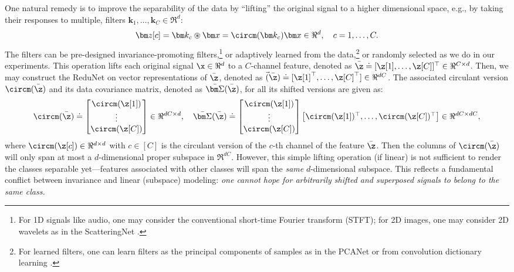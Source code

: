 \documentclass[../../book-main.tex]{subfiles}
\begin{document}
One natural remedy is to improve the separability of the data by ``lifting'' the original signal to a higher dimensional space, e.g., by taking their responses to multiple, filters $\bm k_1, \ldots, \bm k_C \in \Re^d$: 
\begin{equation}
\bm z[c] = \bm k_c \circledast \bm x  =  \circm(\bm k_c) \bm x \in \Re^d, \quad c = 1, \ldots, C.
\label{eqn:lift-1d}
\end{equation} 
The filters can be pre-designed invariance-promoting filters,\footnote{For 1D signals like audio, one may consider the conventional short-time Fourier transform (STFT); for 2D images, one may consider 2D wavelets as in the ScatteringNet \cite{scattering-net}.} or adaptively learned from the data,\footnote{For learned filters, one can learn filters as the principal components of samples as in the PCANet \cite{chan2015pcanet} or from convolution dictionary learning \cite{li2019multichannel,qu2019nonconvex}.} or randomly selected as we do in our experiments. This operation lifts each original signal $\x \in \Re^d$ to a $C$-channel feature, denoted as $\bar{\z}  \doteq [\z[1], \ldots, \z[C]]^\top \in \Re^{C\times d}$. 
Then, we may construct the ReduNet on vector representations of $\bar{\z}$, denoted as
$\vec(\bar\z) \doteq [\z[1]^\top, \ldots, \z[C]^\top] \in \Re^{dC}$. 
The associated circulant version $ \circm(\bar{\z})$ and its data covariance matrix, denoted as $\bar{\bm \Sigma}(\bar\z)$, for all its shifted versions are given as:
\begin{equation}
\begin{aligned}
 \circm(\bar{\z}) \doteq \left[\begin{matrix}
    \circm(\z[1])  \\ \vdots \\ \circm(\z[C]) \end{matrix} \right] \in \Re^{dC\times d}, 
    \quad  \bar{\bm \Sigma}(\bar\z) \doteq 
    \left[\begin{matrix}
    \circm(\z[1]) \\ \vdots \\ \circm(\z[C]) \end{matrix} \right]
    \left[\begin{matrix}\circm(\z[1])^\top,\ldots, \circm(\z[C])^\top\end{matrix} \right] \in \Re^{dC\times dC},
    \label{eqn:W-multichannel}
\end{aligned}
\end{equation}
where $\circm(\z[c]) \in \Re^{d\times d}$ with $c \in [C]$ is the circulant version of the $c$-th channel of the feature $\bar \z$. Then the columns of $\circm(\bar\z)$  will only span at most a $d$-dimensional proper subspace in $\Re^{dC}$.  However, this simple lifting operation (if linear) is not sufficient to render the classes separable yet---features associated with other classes will span the {\em same} $d$-dimensional subspace. This reflects a fundamental conflict between invariance and linear (subspace) modeling: {\em one cannot hope for arbitrarily shifted and superposed signals to belong to the same class.} 
\end{document}
